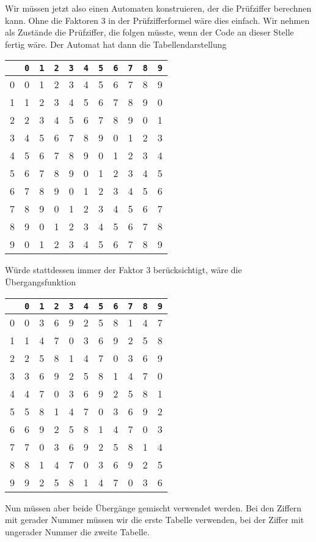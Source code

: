 \begin{loesung}
Wir müssen jetzt also einen Automaten konstruieren, der die
Prüfziffer berechnen kann.
Ohne die Faktoren $3$ in der Prüfzifferformel
wäre dies einfach. Wir nehmen als Zustände die Prüfziffer,
die folgen müsste, wenn der Code an dieser Stelle fertig wäre.
Der Automat hat dann die Tabellendarstellung
\begin{center}
\begin{tabular}{|c|cccccccccc|}
\hline
&{\tt 0} &{\tt 1} &{\tt 2} &{\tt 3} &{\tt 4} &{\tt 5} &{\tt 6} &{\tt 7} &{\tt 8} &{\tt 9}\\
\hline
0&0&1&2&3&4&5&6&7&8&9\\
1&1&2&3&4&5&6&7&8&9&0\\
2&2&3&4&5&6&7&8&9&0&1\\
3&4&5&6&7&8&9&0&1&2&3\\
4&5&6&7&8&9&0&1&2&3&4\\
5&6&7&8&9&0&1&2&3&4&5\\
6&7&8&9&0&1&2&3&4&5&6\\
7&8&9&0&1&2&3&4&5&6&7\\
8&9&0&1&2&3&4&5&6&7&8\\
9&0&1&2&3&4&5&6&7&8&9\\
\hline
\end{tabular}
\end{center}
Würde stattdessen immer der Faktor $3$ berücksichtigt, wäre
die Übergangsfunktion
\begin{center}
\begin{tabular}{|c|cccccccccc|}
\hline
&{\tt 0} &{\tt 1} &{\tt 2} &{\tt 3} &{\tt 4} &{\tt 5} &{\tt 6} &{\tt 7} &{\tt 8} &{\tt 9}\\
\hline
0&0&3&6&9&2&5&8&1&4&7\\
1&1&4&7&0&3&6&9&2&5&8\\
2&2&5&8&1&4&7&0&3&6&9\\
3&3&6&9&2&5&8&1&4&7&0\\
4&4&7&0&3&6&9&2&5&8&1\\
5&5&8&1&4&7&0&3&6&9&2\\
6&6&9&2&5&8&1&4&7&0&3\\
7&7&0&3&6&9&2&5&8&1&4\\
8&8&1&4&7&0&3&6&9&2&5\\
9&9&2&5&8&1&4&7&0&3&6\\
\hline
\end{tabular}
\end{center}
Nun müssen aber beide Übergänge gemischt verwendet werden.
Bei den Ziffern mit gerader Nummer müssen wir die erste Tabelle
verwenden, bei der Ziffer mit ungerader Nummer die zweite Tabelle.

\end{loesung}
